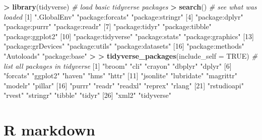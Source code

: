 \documentclass[
]{book}
\newenvironment{Shaded}{\begin{snugshade}}{\end{snugshade}}
\newcommand{\CommentTok}[1]{\textcolor[rgb]{0.56,0.35,0.01}{\textit{#1}}}
\newcommand{\DataTypeTok}[1]{\textcolor[rgb]{0.13,0.29,0.53}{#1}}
\newcommand{\DecValTok}[1]{\textcolor[rgb]{0.00,0.00,0.81}{#1}}
\newcommand{\ErrorTok}[1]{\textcolor[rgb]{0.64,0.00,0.00}{\textbf{#1}}}
\newcommand{\KeywordTok}[1]{\textcolor[rgb]{0.13,0.29,0.53}{\textbf{#1}}}
\newcommand{\NormalTok}[1]{#1}
\newcommand{\OperatorTok}[1]{\textcolor[rgb]{0.81,0.36,0.00}{\textbf{#1}}}
\newcommand{\OtherTok}[1]{\textcolor[rgb]{0.56,0.35,0.01}{#1}}
\newcommand{\StringTok}[1]{\textcolor[rgb]{0.31,0.60,0.02}{#1}}
\begin{document}
\begin{Shaded}
\begin{Highlighting}[]
\OperatorTok{>}\StringTok{ }\KeywordTok{library}\NormalTok{(tidyverse)  }\CommentTok{# load basic tidyverse packages}
\OperatorTok{>}\StringTok{ }\KeywordTok{search}\NormalTok{()  }\CommentTok{# see what was loaded}
\NormalTok{ [}\DecValTok{1}\NormalTok{] }\StringTok{".GlobalEnv"}        \StringTok{"package:forcats"}   \StringTok{"package:stringr"}  
\NormalTok{ [}\DecValTok{4}\NormalTok{] }\StringTok{"package:dplyr"}     \StringTok{"package:purrr"}     \StringTok{"package:readr"}    
\NormalTok{ [}\DecValTok{7}\NormalTok{] }\StringTok{"package:tidyr"}     \StringTok{"package:tibble"}    \StringTok{"package:ggplot2"}  
\NormalTok{[}\DecValTok{10}\NormalTok{] }\StringTok{"package:tidyverse"} \StringTok{"package:stats"}     \StringTok{"package:graphics"} 
\NormalTok{[}\DecValTok{13}\NormalTok{] }\StringTok{"package:grDevices"} \StringTok{"package:utils"}     \StringTok{"package:datasets"} 
\NormalTok{[}\DecValTok{16}\NormalTok{] }\StringTok{"package:methods"}   \StringTok{"Autoloads"}         \StringTok{"package:base"}     
\OperatorTok{>}\StringTok{ }
\ErrorTok{>}\StringTok{ }\KeywordTok{tidyverse_packages}\NormalTok{(}\DataTypeTok{include_self =} \OtherTok{TRUE}\NormalTok{)  }\CommentTok{# list all packages in tidyverse}
\NormalTok{ [}\DecValTok{1}\NormalTok{] }\StringTok{"broom"}      \StringTok{"cli"}        \StringTok{"crayon"}     \StringTok{"dbplyr"}     \StringTok{"dplyr"}     
\NormalTok{ [}\DecValTok{6}\NormalTok{] }\StringTok{"forcats"}    \StringTok{"ggplot2"}    \StringTok{"haven"}      \StringTok{"hms"}        \StringTok{"httr"}      
\NormalTok{[}\DecValTok{11}\NormalTok{] }\StringTok{"jsonlite"}   \StringTok{"lubridate"}  \StringTok{"magrittr"}   \StringTok{"modelr"}     \StringTok{"pillar"}    
\NormalTok{[}\DecValTok{16}\NormalTok{] }\StringTok{"purrr"}      \StringTok{"readr"}      \StringTok{"readxl"}     \StringTok{"reprex"}     \StringTok{"rlang"}     
\NormalTok{[}\DecValTok{21}\NormalTok{] }\StringTok{"rstudioapi"} \StringTok{"rvest"}      \StringTok{"stringr"}    \StringTok{"tibble"}     \StringTok{"tidyr"}     
\NormalTok{[}\DecValTok{26}\NormalTok{] }\StringTok{"xml2"}       \StringTok{"tidyverse"} 
\end{Highlighting}
\end{Shaded}

\hypertarget{r-markdown}{%
\section{R markdown}\label{r-markdown}}
\end{document}
